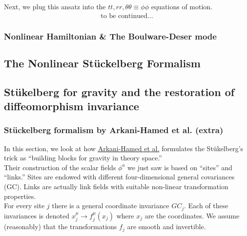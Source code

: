 \documentclass{book}
\theoremstyle{definition}
\begin{document}
Next, we plug this ansatz into the $tt,rr,\theta\theta \equiv \phi\phi$ equations of motion. 
\begin{align}
\text{to be continued}\dots
\end{align}


\newpage
\subsubsection{Nonlinear Hamiltonian \& The Boulware-Deser mode}












\newpage


\subsection{The Nonlinear St\"{u}ckelberg Formalism}




\subsection{St\"{u}kelberg for gravity and the restoration of diffeomorphism invariance}




\subsubsection{St\"{u}ckelberg formalism by Arkani-Hamed et al. (extra)}


In this section, we look at how \href{https://arxiv.org/pdf/hep-th/0210184.pdf}{\underline{Arkani-Hamed et al.}} formulates the St\"{u}kelberg's trick as ``building blocks for gravity in theory space.''\\

Their construction of the scalar fields $\phi^a$ we just saw is based on ``sites'' and ``links.'' Sites are endowed with different four-dimensional general covariances (GC). Links are actually link fields with suitable non-linear transformation properties. \\

For every site $j$ there is a general coordinate invariance $GC_j$. Each of these invariances is denoted $x^\mu_j \to f^\mu_j(x_j)$ where $x_j$ are the coordinates. We assume (reasonably) that the transformations $f_j$ are smooth and invertible.\\
\end{document}
